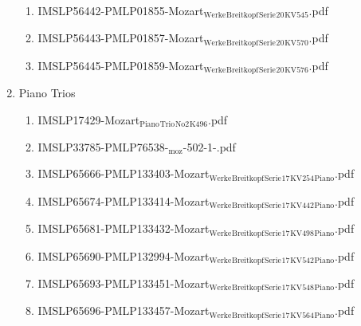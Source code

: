 \documentclass[11pt]{article}
\begin{document}
\begin{enumerate}
\begin{enumerate}
\item IMSLP56442-PMLP01855-Mozart$_{\text{Werke}}$$_{\text{Breitkopf}}$$_{\text{Serie}}$$_{\text{20}}$$_{\text{KV545}}$.pdf
\label{sec-1-1-1-1-44-49-6-17}

\item IMSLP56443-PMLP01857-Mozart$_{\text{Werke}}$$_{\text{Breitkopf}}$$_{\text{Serie}}$$_{\text{20}}$$_{\text{KV570}}$.pdf
\label{sec-1-1-1-1-44-49-6-18}

\item IMSLP56445-PMLP01859-Mozart$_{\text{Werke}}$$_{\text{Breitkopf}}$$_{\text{Serie}}$$_{\text{20}}$$_{\text{KV576}}$.pdf
\label{sec-1-1-1-1-44-49-6-19}
\end{enumerate}

\item Piano Trios
\label{sec-1-1-1-1-44-49-7}
\begin{enumerate}
\item IMSLP17429-Mozart$_{\text{Piano}}$$_{\text{Trio}}$$_{\text{No2}}$$_{\text{K496}}$.pdf
\label{sec-1-1-1-1-44-49-7-1}

\item IMSLP33785-PMLP76538-$_{\text{moz}}$-502-1-.pdf
\label{sec-1-1-1-1-44-49-7-2}

\item IMSLP65666-PMLP133403-Mozart$_{\text{Werke}}$$_{\text{Breitkopf}}$$_{\text{Serie}}$$_{\text{17}}$$_{\text{KV254}}$$_{\text{Piano}}$.pdf
\label{sec-1-1-1-1-44-49-7-3}

\item IMSLP65674-PMLP133414-Mozart$_{\text{Werke}}$$_{\text{Breitkopf}}$$_{\text{Serie}}$$_{\text{17}}$$_{\text{KV442}}$$_{\text{Piano}}$.pdf
\label{sec-1-1-1-1-44-49-7-4}

\item IMSLP65681-PMLP133432-Mozart$_{\text{Werke}}$$_{\text{Breitkopf}}$$_{\text{Serie}}$$_{\text{17}}$$_{\text{KV498}}$$_{\text{Piano}}$.pdf
\label{sec-1-1-1-1-44-49-7-5}

\item IMSLP65690-PMLP132994-Mozart$_{\text{Werke}}$$_{\text{Breitkopf}}$$_{\text{Serie}}$$_{\text{17}}$$_{\text{KV542}}$$_{\text{Piano}}$.pdf
\label{sec-1-1-1-1-44-49-7-6}

\item IMSLP65693-PMLP133451-Mozart$_{\text{Werke}}$$_{\text{Breitkopf}}$$_{\text{Serie}}$$_{\text{17}}$$_{\text{KV548}}$$_{\text{Piano}}$.pdf
\label{sec-1-1-1-1-44-49-7-7}

\item IMSLP65696-PMLP133457-Mozart$_{\text{Werke}}$$_{\text{Breitkopf}}$$_{\text{Serie}}$$_{\text{17}}$$_{\text{KV564}}$$_{\text{Piano}}$.pdf
\label{sec-1-1-1-1-44-49-7-8}
\end{enumerate}


\end{enumerate}
\end{document}
